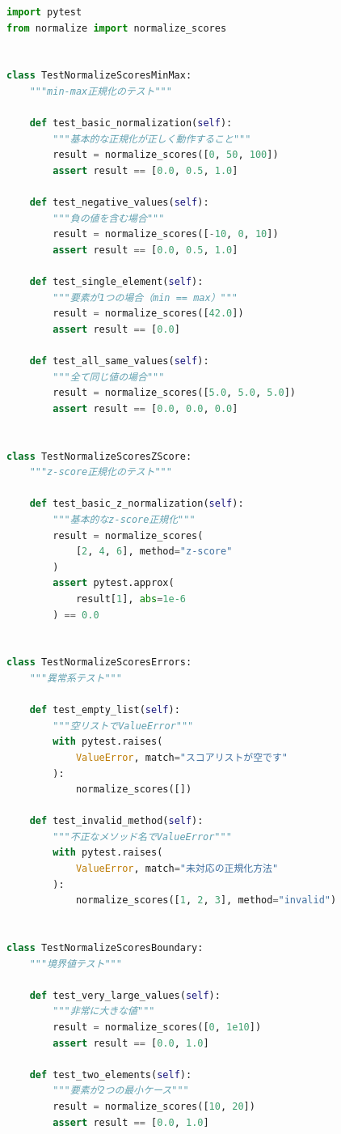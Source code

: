 \begin{lstlisting}[language=Python]
import pytest
from normalize import normalize_scores


class TestNormalizeScoresMinMax:
    """min-max正規化のテスト"""

    def test_basic_normalization(self):
        """基本的な正規化が正しく動作すること"""
        result = normalize_scores([0, 50, 100])
        assert result == [0.0, 0.5, 1.0]

    def test_negative_values(self):
        """負の値を含む場合"""
        result = normalize_scores([-10, 0, 10])
        assert result == [0.0, 0.5, 1.0]

    def test_single_element(self):
        """要素が1つの場合（min == max）"""
        result = normalize_scores([42.0])
        assert result == [0.0]

    def test_all_same_values(self):
        """全て同じ値の場合"""
        result = normalize_scores([5.0, 5.0, 5.0])
        assert result == [0.0, 0.0, 0.0]


class TestNormalizeScoresZScore:
    """z-score正規化のテスト"""

    def test_basic_z_normalization(self):
        """基本的なz-score正規化"""
        result = normalize_scores(
            [2, 4, 6], method="z-score"
        )
        assert pytest.approx(
            result[1], abs=1e-6
        ) == 0.0


class TestNormalizeScoresErrors:
    """異常系テスト"""

    def test_empty_list(self):
        """空リストでValueError"""
        with pytest.raises(
            ValueError, match="スコアリストが空です"
        ):
            normalize_scores([])

    def test_invalid_method(self):
        """不正なメソッド名でValueError"""
        with pytest.raises(
            ValueError, match="未対応の正規化方法"
        ):
            normalize_scores([1, 2, 3], method="invalid")


class TestNormalizeScoresBoundary:
    """境界値テスト"""

    def test_very_large_values(self):
        """非常に大きな値"""
        result = normalize_scores([0, 1e10])
        assert result == [0.0, 1.0]

    def test_two_elements(self):
        """要素が2つの最小ケース"""
        result = normalize_scores([10, 20])
        assert result == [0.0, 1.0]
\end{lstlisting}


